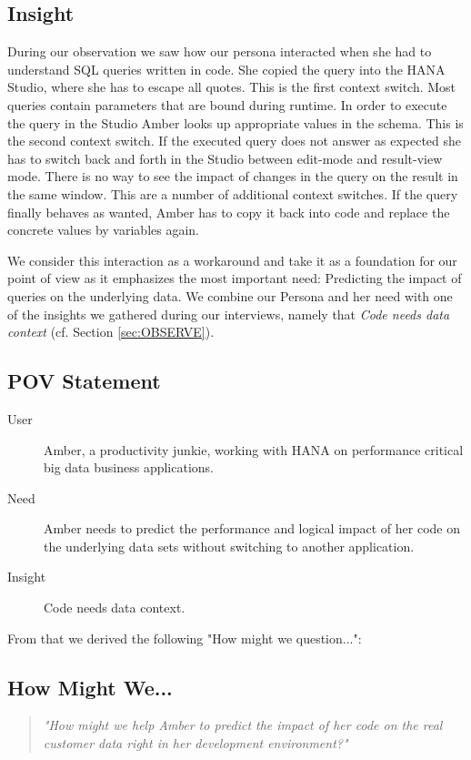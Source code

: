 \subsection{Insight}

During our observation we saw how our persona interacted when she had to understand SQL queries written in code. She copied the query into the HANA Studio, where she has to escape all quotes. This is the first context switch. Most queries contain parameters that are bound during runtime. In order to execute the query in the Studio Amber looks up appropriate values in the schema. This is the second context switch. If the executed query does not answer as expected she has to switch back and forth in the Studio between edit-mode and result-view mode. There is no way to see the impact of changes in the query on the result in the same window. This are a number of additional context switches. If the query finally behaves as wanted, Amber has to copy it back into code and replace the concrete values by variables again.  

We consider this interaction as a workaround and take it as a foundation for our point of view as it emphasizes the most important need: Predicting the impact of queries on the underlying data. We combine our Persona and her need with one of the insights we gathered during our interviews, namely that \textit{Code needs data context} (cf. Section \ref{sec:OBSERVE}).


\subsection{POV Statement}

\begin{description}
	\item [User] Amber, a productivity junkie, working with HANA on performance critical big data business applications.
	\item [Need] Amber needs to predict the performance and logical impact of her code on the underlying data sets without switching to another application.
	\item [Insight] Code needs data context.
\end{description}

From that we derived the following "How might we question...":

\subsection{How Might We...}

\begin{quote}
\emph{"How might we help Amber to predict the impact of her code on the real customer data right in her development environment?"}
\end{quote}